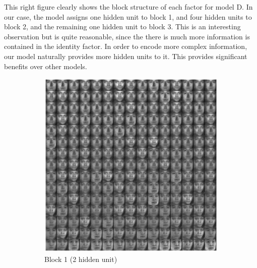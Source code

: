 This right figure clearly shows the block structure of each factor for model D. In our case, the model assigns one hidden unit to block 1, and four hidden units to block 2, and the remaining one hidden unit to block 3. This is an interesting observation but is quite reasonable, since the there is much more information is contained in the identity factor. In order to encode more complex information, our model naturally provides more hidden units to it. This provides significant benefits over other models.
\begin{figure}
\centering
    \begin{subfigure}[b]{0.5\textwidth}
    \includegraphics[width=\textwidth]{images/faceNWblock1.eps}
    \vspace{-2\baselineskip}
    \caption{Block 1 (2 hidden unit)}
    \end{subfigure}
	\begin{subfigure}[b]{0.5\textwidth}

\end{subfigure}
\end{figure}
